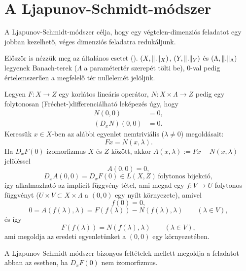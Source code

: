 \documentclass[oneside, titlepage, 12pt, a4paper]{report}
\DeclarePairedDelimiter\norm{\lVert}{\rVert}	%
\begin{document}

\onehalfspacing
\chapter{A Ljapunov-Schmidt-módszer}
\label{chap:modszer}

A Ljapunov-Schmidt-módszer célja, hogy egy végtelen-dimenziós feladatot egy jobban kezelhető, véges dimenziós feladatra redukáljunk. \par
Először is nézzük meg az általános esetet (\cite{8.6TLSM}). $(X, \norm{.}_X)$, $(Y, \norm{.}_Y)$ és $(\Lambda, \norm{.}_\Lambda)$ legyenek Banach-terek ($\Lambda$ a paramétertér szerepét tölti be), 0-val pedig értelemszerűen a megfelelő tér nullelemét jelöljük.\par
Legyen $F : X \rightarrow Z$ egy korlátos lineáris operátor, $N : X \times \Lambda \rightarrow Z$ pedig egy folytonosan (Fréchet-)differenciálható leképezés úgy, hogy
\begin{align*}
N(0, 0) &= 0, \\
(D_xN)(0,0) &= 0.
\end{align*}
Keressük $x \in X$-ben az alábbi egyenlet nemtriviális ($\lambda \ne 0$) megoldásait:
\begin{equation}
Fx = N(x, \lambda).
\end{equation}
Ha $D_xF(0)$ izomorfizmus $X$ és $Z$ között, akkor $A(x, \lambda) := Fx - N(x, \lambda)$ jelöléssel
\begin{equation*}
A(0, 0) = 0,
\end{equation*}
\begin{equation*}
D_xA(0, 0) = D_xF(0) \in L(X, Z) \, \text{folytonos bijekció},
\end{equation*}
így alkalmazható az implicit függvény tétel, ami megad egy $f : V \rightarrow U$ folytonos függvényt ($U \times V \subset X \times \Lambda$ a $(0, 0)$ egy nyílt környezete), amivel
\begin{equation*}
f(0) = 0,
\end{equation*}
\begin{equation*}
0 = A(f(\lambda), \lambda) = F(f(\lambda)) - N(f(\lambda), \lambda) \qquad (\lambda \in V),
\end{equation*}
és így 
\begin{equation*}
F(f(\lambda)) = N( f(\lambda), \lambda) \qquad (\lambda \in V),
\end{equation*}
ami megoldja az eredeti egyenletünket a $(0, 0)$ egy környezetében.\par
A Ljapunov-Schmidt-módszer bizonyos feltételek mellett megoldja a feladatot abban az esetben, ha $D_xF(0)$ nem izomorfizmus.	%



 

 
\end{document}
